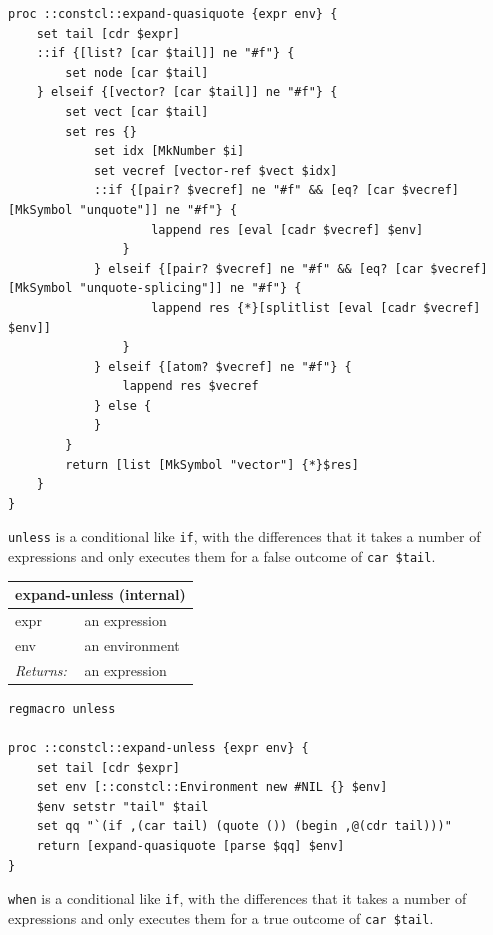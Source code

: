 \documentclass[twoside,9pt]{report}
\begin{document}
\noindent\makebox[\linewidth]{\rule{\linewidth}{0.4pt}}
\begin{lstlisting}
proc ::constcl::expand-quasiquote {expr env} {
    set tail [cdr $expr]
    ::if {[list? [car $tail]] ne "#f"} {
        set node [car $tail]
    } elseif {[vector? [car $tail]] ne "#f"} {
        set vect [car $tail]
        set res {}
            set idx [MkNumber $i]
            set vecref [vector-ref $vect $idx]
            ::if {[pair? $vecref] ne "#f" && [eq? [car $vecref] [MkSymbol "unquote"]] ne "#f"} {
                    lappend res [eval [cadr $vecref] $env]
                }
            } elseif {[pair? $vecref] ne "#f" && [eq? [car $vecref] [MkSymbol "unquote-splicing"]] ne "#f"} {
                    lappend res {*}[splitlist [eval [cadr $vecref] $env]]
                }
            } elseif {[atom? $vecref] ne "#f"} {
                lappend res $vecref
            } else {
            }
        }
        return [list [MkSymbol "vector"] {*}$res]
    }
}
\end{lstlisting}
\noindent\makebox[\linewidth]{\rule{\linewidth}{0.4pt}}

\texttt{unless} is a conditional like \texttt{if}, with the differences that it takes a number of expressions and only executes them for a false outcome of \texttt{car \$tail}.

\begin{tabular}{ |l l| }
\hline
\multicolumn{2}{|l|}{expand-unless (internal)} \\
\hline
expr & an expression \\
env & an environment \\
\textit{Returns:} & an expression \\
\hline
\end{tabular}

\noindent\makebox[\linewidth]{\rule{\linewidth}{0.4pt}}
\begin{lstlisting}
regmacro unless
 
proc ::constcl::expand-unless {expr env} {
    set tail [cdr $expr]
    set env [::constcl::Environment new #NIL {} $env]
    $env setstr "tail" $tail
    set qq "`(if ,(car tail) (quote ()) (begin ,@(cdr tail)))"
    return [expand-quasiquote [parse $qq] $env]
}
\end{lstlisting}
\noindent\makebox[\linewidth]{\rule{\linewidth}{0.4pt}}

\texttt{when} is a conditional like \texttt{if}, with the differences that it takes a number of expressions and only executes them for a true outcome of \texttt{car \$tail}.
\end{document}
